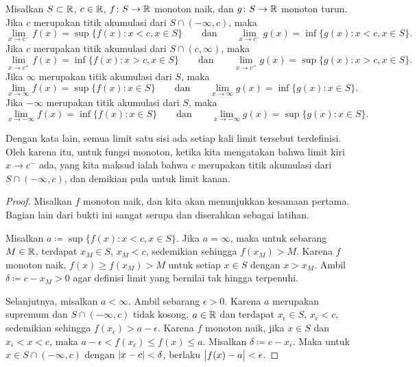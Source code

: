 \begin{prop} \label{prop:monotlimits}
Misalkan $S \subset {\mathbb{R}}$, $c \in {\mathbb{R}}$,
$f \colon S \to {\mathbb{R}}$ monoton naik,
dan
$g \colon S \to {\mathbb{R}}$ monoton turun.
Jika $c$ merupakan titik akumulasi dari $S \cap (-\infty,c)$, maka
\begin{equation*}
\lim_{x \to c^-} f(x) = \sup \{ f(x) : x < c, x \in S \}
\qquad \text{dan} \qquad
\lim_{x \to c^-} g(x) = \inf \{ g(x) : x < c, x \in S \} .
\end{equation*}
Jika $c$ merupakan titik akumulasi dari $S \cap (c,\infty)$, maka
\begin{equation*}
\lim_{x \to c^+} f(x) = \inf \{ f(x) : x > c, x \in S \}
\qquad \text{dan} \qquad
\lim_{x \to c^+} g(x) = \sup \{ g(x) : x > c, x \in S \} .
\end{equation*}
Jika $\infty$ merupakan titik akumulasi dari $S$, maka
\begin{equation*}
\lim_{x \to \infty} f(x) = \sup \{ f(x) : x \in S \}
\qquad \text{dan} \qquad
\lim_{x \to \infty} g(x) = \inf \{ g(x) : x \in S \} .
\end{equation*}
Jika $-\infty$ merupakan titik akumulasi dari $S$, maka
\begin{equation*}
\lim_{x \to -\infty} f(x) = \inf \{ f(x) : x \in S \}
\qquad \text{dan} \qquad
\lim_{x \to -\infty} g(x) = \sup \{ g(x) : x \in S \} .
\end{equation*}
\end{prop}

Dengan kata lain, semua limit satu sisi ada setiap kali limit tersebut
terdefinisi.  Oleh karena itu, untuk fungsi monoton, ketika kita mengatakan
bahwa limit kiri $x \to c^-$
ada, yang kita maksud ialah bahwa $c$ merupakan titik akumulasi dari $S \cap (-\infty,c)$,
dan demikian pula untuk limit kanan.

\begin{proof}
Misalkan $f$ monoton naik, dan kita akan menunjukkan kesamaan
pertama.  Bagian lain dari bukti ini sangat serupa dan diserahkan sebagai
latihan.

Misalkan $a \coloneqq \sup \{ f(x) : x < c, x \in S \}$.  Jika $a = \infty$,
maka untuk sebarang $M \in {\mathbb{R}}$, terdapat $x_M \in S$, $x_M < c$, sedemikian sehingga $f(x_M) > M$. 
Karena $f$ monoton naik, $f(x) \geq f(x_M) >  M$ untuk setiap $x \in S$ dengan $x > x_M$.
Ambil $\delta \coloneqq c-x_M > 0$ agar definisi limit yang
bernilai tak hingga terpenuhi.

Selanjutnya, misalkan $a < \infty$.
Ambil sebarang $\epsilon > 0$.  Karena $a$ merupakan supremum dan
$S \cap (-\infty,c)$ tidak kosong, $a \in {\mathbb{R}}$ dan
terdapat
$x_\epsilon \in S$,
$x_\epsilon < c$,
sedemikian sehingga $f(x_\epsilon) > a-\epsilon$.  Karena $f$ monoton naik,
jika $x \in S$ dan $x_\epsilon < x < c$, maka
$a-\epsilon < f(x_\epsilon) \leq f(x) \leq a$.  Misalkan
$\delta \coloneqq c-x_\epsilon$.  Maka untuk $x \in S \cap (-\infty,c)$
dengan $\lvert {x-c} \rvert < \delta$,
berlaku $\bigl\lvert {f(x)-a} \bigr\rvert < \epsilon$.
\end{proof}

